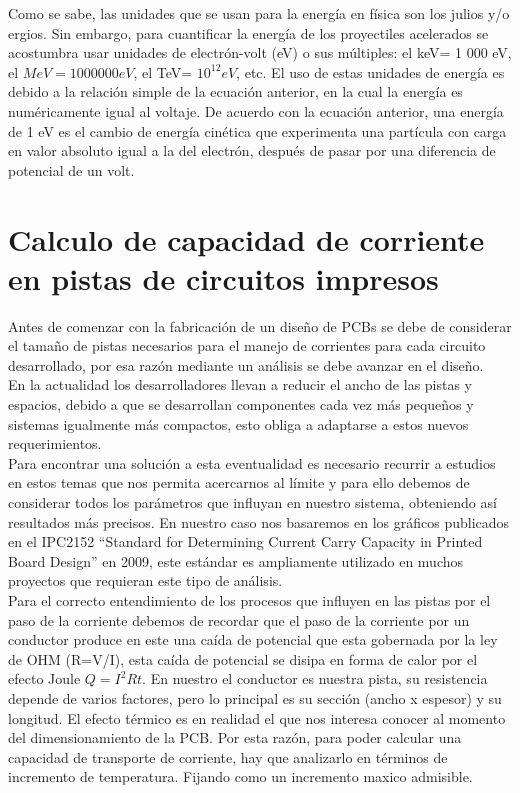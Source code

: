 Como se sabe, las unidades que se usan para la energía en física son los julios
y/o ergios. Sin embargo, para cuantificar la energía de los proyectiles acelerados se acostumbra usar unidades de electrón-volt (eV) o sus múltiples: el keV= 1 000 eV, el $MeV= 1 000 000 eV$, el TeV= $10^{12} eV$, etc. El uso de estas unidades de energía
es debido a la relación simple de la ecuación anterior, en la cual la energía es
numéricamente igual al voltaje. De acuerdo con la ecuación anterior, una energía
de 1 eV es el cambio de energía cinética que experimenta una partícula con carga
en valor absoluto igual a la del electrón, después de pasar por una diferencia de
potencial de un volt. \cite{acelerado}

\newpage
\section{Calculo de capacidad de corriente en pistas de circuitos impresos}



Antes de comenzar con la fabricación de un diseño de PCBs se debe de considerar el tamaño de pistas necesarios para el manejo de corrientes para cada circuito desarrollado, por esa razón mediante un análisis se debe avanzar en el diseño.\\

En la actualidad los desarrolladores llevan a reducir el ancho de las pistas y espacios, debido a que se desarrollan componentes cada vez más pequeños y sistemas igualmente más compactos, esto obliga a adaptarse a estos nuevos requerimientos.\\

Para encontrar una solución a esta eventualidad es necesario recurrir a estudios en estos temas que nos permita acercarnos al límite y para ello debemos de considerar todos los parámetros que influyan en nuestro sistema, obteniendo así resultados más precisos. En nuestro caso nos basaremos en los gráficos publicados en el IPC2152 \cite{IPC 2152} ``Standard for Determining Current Carry Capacity in Printed Board Design'' en 2009, este estándar es ampliamente utilizado en muchos proyectos que requieran este tipo de análisis. \\  

Para el correcto entendimiento de los procesos que influyen en las pistas por el paso de la corriente debemos de recordar que el paso de la corriente por un conductor produce en este una caída de potencial que esta gobernada por la ley de OHM (R=V/I), esta caída de potencial se disipa en forma de calor por el efecto Joule $Q=I^{2}Rt$. En nuestro el conductor es nuestra pista, su resistencia depende de varios factores, pero lo principal es su sección (ancho x espesor) y su longitud. El efecto térmico es en realidad el que nos interesa conocer al momento del dimensionamiento de la PCB. Por esta razón, para poder calcular una capacidad de transporte de corriente, hay que analizarlo en términos de incremento de temperatura. Fijando como un incremento maxico admisible.\\

